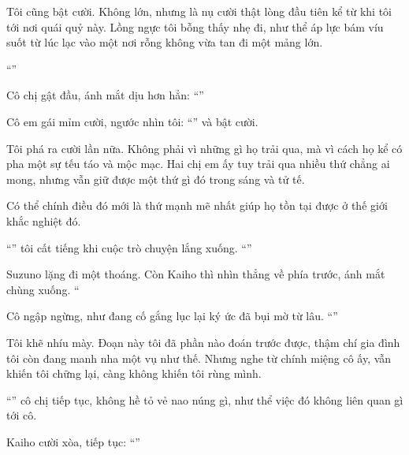 \documentclass[../main.tex]{subfiles}
\begin{document}
Tôi cũng bật cười. Không lớn, nhưng là nụ cười thật lòng đầu tiên kể từ khi tôi tới nơi quái quỷ này. Lồng ngực tôi bỗng thấy nhẹ đi, như thể áp lực bám víu suốt từ lúc lạc vào một nơi rỗng không vừa tan đi một mảng lớn.

``''

Cô chị gật đầu, ánh mắt dịu hơn hẳn: ``''

Cô em gái mỉm cười, ngước nhìn tôi: ``'' và bật cười.

Tôi phá ra cười lần nữa. Không phải vì những gì họ trải qua, mà vì cách họ kể có pha một sự tếu táo và mộc mạc. Hai chị em ấy tuy trải qua nhiều thứ chẳng ai mong, nhưng vẫn giữ được một thứ gì đó trong sáng và tử tế.

Có thể chính điều đó mới là thứ mạnh mẽ nhất giúp họ tồn tại được ở thế giới khắc nghiệt đó.

``'' tôi cất tiếng khi cuộc trò chuyện lắng xuống. ``''

Suzuno lặng đi một thoáng. Còn Kaiho thì nhìn thẳng về phía trước, ánh mắt chùng xuống. ``

Cô ngập ngừng, như đang cố gắng lục lại ký ức đã bụi mờ từ lâu. ``''

Tôi khẽ nhíu mày. Đoạn này tôi đã phần nào đoán trước được, thậm chí gia đình tôi còn đang manh nha một vụ như thế. Nhưng nghe từ chính miệng cô ấy, vẫn khiến tôi chững lại, càng không khiến tôi rùng mình.

``'' cô chị tiếp tục, không hề tỏ vẻ nao núng gì, như thể việc đó không liên quan gì tới cô.

Kaiho cười xòa, tiếp tục: ``''
\end{document}

